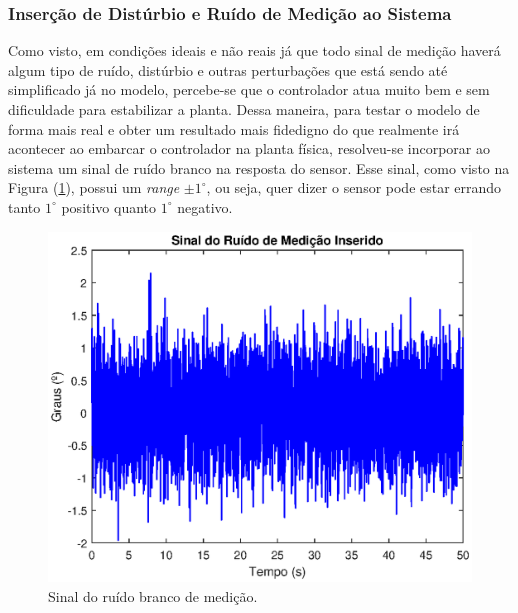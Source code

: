 \subsubsection{Inserção de Distúrbio e Ruído de Medição ao Sistema}

Como visto, em condições ideais e não reais já que todo sinal de medição haverá algum tipo de ruído, distúrbio e outras perturbações que está sendo até simplificado já no modelo, percebe-se que o controlador atua muito bem e sem dificuldade para estabilizar a planta. Dessa maneira, para testar o modelo de forma mais real e obter um resultado mais fidedigno do que realmente irá acontecer ao embarcar o controlador na planta física, resolveu-se incorporar ao sistema um sinal de ruído branco na resposta do sensor. Esse sinal, como visto na Figura (\ref{fig:SinalRuidoBranco}), possui um \textit{range} $\pm 1^\circ$, ou seja, quer dizer o sensor pode estar errando tanto $1^\circ$ positivo quanto $1^\circ$ negativo.
\begin{figure}[H]
    \centering
    \includegraphics[scale=0.75]{ProjControladores/ruido_branco_medicao.eps}
    \caption{Sinal do ruído branco de medição.}
    \label{fig:SinalRuidoBranco}
\end{figure}{}

